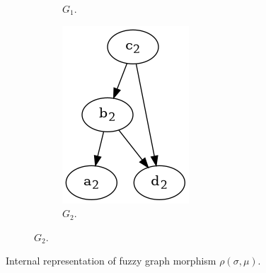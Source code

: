 \begin{frame}
\begin{figure}[htbp]
\begin{subfigure}[t]{0.18\textwidth}
\begin{subfigure}[t]{\textwidth}
				\caption{$G_1$.}
			\end{subfigure}
			\begin{subfigure}[t]{0.8\textwidth}
				\centering
				\includegraphics[width=\linewidth,valign=t]{inc/fuzzy_graph_theory/fuzzy_graph_morphism_G2.png}
				\caption{$G_2$.}
			\end{subfigure}
		\end{subfigure}
		\caption{Internal representation of fuzzy graph morphism $\rho(\sigma, \mu)$.}
	\end{figure}
\end{frame}

